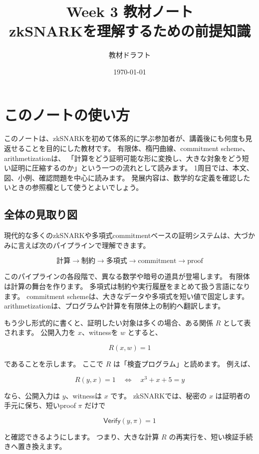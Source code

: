 \documentclass[a4paper,11pt]{ltjsarticle}
\title{Week 3 教材ノート\\zkSNARKを理解するための前提知識}
\author{教材ドラフト}
\date{\today}
\newcommand{\Verify}{\mathsf{Verify}}
\begin{document}
\maketitle
\tableofcontents
\newpage

\section{このノートの使い方}

このノートは、zkSNARKを初めて体系的に学ぶ参加者が、講義後にも何度も見返せることを目的にした教材です。
有限体、楕円曲線、commitment scheme、arithmetizationは、
「計算をどう証明可能な形に変換し、大きな対象をどう短い証明に圧縮するのか」という一つの流れとして読みます。
1周目では、本文、図、小例、確認問題を中心に読みます。
発展内容は、数学的な定義を確認したいときの参照欄として使うとよいでしょう。

\subsection{全体の見取り図}

現代的な多くのzkSNARKや多項式commitmentベースの証明システムは、大づかみに言えば次のパイプラインで理解できます。

\[
  \text{計算}
  \longrightarrow
  \text{制約}
  \longrightarrow
  \text{多項式}
  \longrightarrow
  \text{commitment}
  \longrightarrow
  \text{proof}
\]

このパイプラインの各段階で、異なる数学や暗号の道具が登場します。
有限体は計算の舞台を作ります。
多項式は制約や実行履歴をまとめて扱う言語になります。
commitment schemeは、大きなデータや多項式を短い値で固定します。
arithmetizationは、プログラムや計算を有限体上の制約へ翻訳します。

もう少し形式的に書くと、証明したい対象は多くの場合、ある関係 \(R\) として表されます。
公開入力を \(x\)、witnessを \(w\) とすると、

\[
  R(x,w)=1
\]

であることを示します。
ここで \(R\) は「検査プログラム」と読めます。
例えば、

\[
  R(y,x)=1 \quad \Longleftrightarrow \quad x^3+x+5=y
\]

なら、公開入力は \(y\)、witnessは \(x\) です。
zkSNARKでは、秘密の \(x\) は証明者の手元に保ち、短いproof \(\pi\) だけで

\[
  \Verify(y,\pi)=1
\]

と確認できるようにします。
つまり、大きな計算 \(R\) の再実行を、短い検証手続きへ置き換えます。
\end{document}
